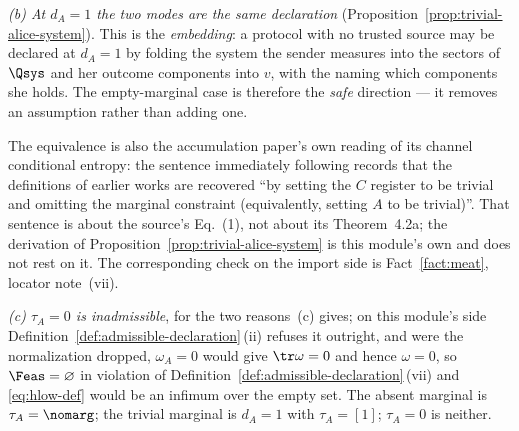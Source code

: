 \begin{remark}
\emph{(b) At $d_A=1$ the two modes are the same declaration}
(Proposition~\ref{prop:trivial-alice-system}). This is the
\emph{embedding}: a protocol with no trusted source may be declared at
$d_A=1$ by folding the system the sender measures into the sectors of
$\Qsys$ and her outcome components into $v$, with the
 naming which components she holds. The
empty-marginal case is therefore the \emph{safe} direction --- it removes
an assumption rather than adding one.

The equivalence is also the accumulation paper's own reading of its
channel conditional entropy: the sentence immediately following
\cite[Eq.~(1)]{arqand2025meat} records that the definitions of earlier
works are recovered ``by setting the $C$ register to be trivial and
omitting the marginal constraint (equivalently, setting $A$ to be
trivial)''. That sentence is about the source's Eq.~(1), not about its
Theorem~4.2a; the derivation of Proposition~\ref{prop:trivial-alice-system}
is this module's own and does not rest on it. The corresponding check on the
import side is Fact~\ref{fact:meat}, locator note~(vii).

\emph{(c) $\tau_A=0$ is inadmissible}, for the two reasons
\,(c) gives; on this module's side
Definition~\ref{def:admissible-declaration}\,(ii) refuses it outright, and were the
normalization dropped, $\omega_A=0$ would give $\tr\omega=0$ and hence
$\omega=0$, so $\Feas=\varnothing$ in violation of
Definition~\ref{def:admissible-declaration}\,(vii) and \eqref{eq:hlow-def} would be an
infimum over the empty set. The absent marginal is $\tau_A=\nomarg$; the
trivial marginal is $d_A=1$ with $\tau_A=[1]$; $\tau_A=0$ is neither.
\end{remark}
